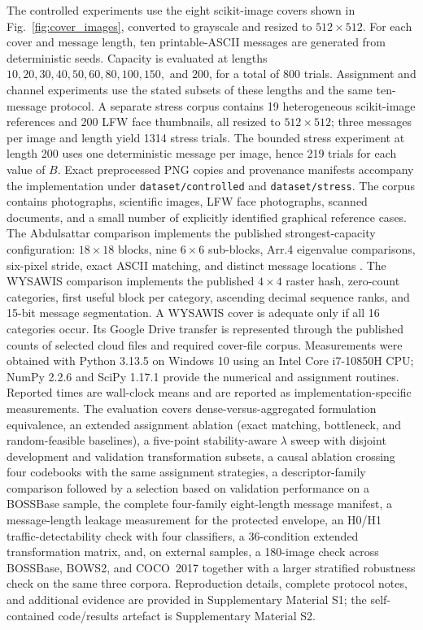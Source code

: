 \documentclass[preprint,12pt]{elsarticle}
\theoremstyle{plain}
\begin{document}
The controlled experiments use the eight scikit-image covers shown in
Fig.~\ref{fig:cover_images}, converted to grayscale and resized to
$512\times512$. For each cover and message length, ten printable-ASCII messages
are generated from deterministic seeds. Capacity is evaluated at lengths
$10,20,30,40,50,60,80,100,150,$ and $200$, for a total of 800 trials.
Assignment and channel experiments use the stated subsets of these lengths and
the same ten-message protocol. A separate stress corpus contains 19
heterogeneous scikit-image references and 200 LFW face thumbnails, all resized
to $512\times512$; three messages per image and length yield 1314 stress trials.
The bounded stress experiment at length 200 uses one deterministic message per
image, hence 219 trials for each value of $B$.
Exact preprocessed PNG copies and provenance manifests accompany the
implementation under \texttt{dataset/controlled} and \texttt{dataset/stress}.
The corpus contains photographs,
scientific images, LFW face photographs, scanned documents, and a small number
of explicitly identified graphical reference cases.
The Abdulsattar comparison implements the published strongest-capacity
configuration: $18\times18$ blocks, nine $6\times6$ sub-blocks, Arr.4
eigenvalue comparisons, six-pixel stride, exact ASCII matching, and distinct
message locations \cite{abdulsattar2021}. The WYSAWIS comparison implements the
published $4\times4$ raster hash, zero-count categories, first useful block per
category, ascending decimal sequence ranks, and 15-bit message segmentation.
A WYSAWIS cover is adequate only if all 16 categories occur. Its Google Drive
transfer is represented through the published counts of selected cloud files
and required cover-file corpus.
Measurements were obtained with Python 3.13.5
on Windows 10 using an Intel Core i7-10850H CPU; NumPy 2.2.6 and SciPy 1.17.1
provide the numerical and assignment routines. Reported times are wall-clock
means and are reported as implementation-specific measurements.
The evaluation covers dense-versus-aggregated formulation equivalence, an
extended assignment ablation (exact matching, bottleneck, and
random-feasible baselines), a five-point stability-aware $\lambda$ sweep with
disjoint development and validation transformation subsets, a causal ablation
crossing four codebooks with the same assignment strategies, a
descriptor-family comparison followed by a selection based on validation performance on a
BOSSBase sample, the complete four-family eight-length message manifest, a
message-length leakage measurement for the protected envelope, an
H0/H1 traffic-detectability check with four classifiers, a 36-condition
extended transformation matrix, and, on external samples, a 180-image check
across BOSSBase, BOWS2, and COCO~2017 together with a larger stratified
robustness check on the same three corpora. Reproduction details, complete protocol notes, and additional evidence are provided in Supplementary Material S1; the self-contained code/results artefact is Supplementary Material S2.
\end{document}
